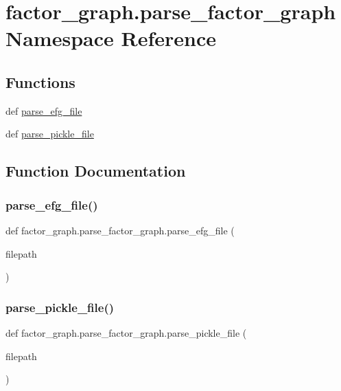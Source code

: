 \hypertarget{namespacefactor__graph_1_1parse__factor__graph}{}\section{factor\+\_\+graph.\+parse\+\_\+factor\+\_\+graph Namespace Reference}
\label{namespacefactor__graph_1_1parse__factor__graph}
\subsection*{Functions}
\begin{DoxyCompactItemize}
\item
def \hyperlink{namespacefactor__graph_1_1parse__factor__graph_afd7a03ddc8e47d16b2426b5b5edc9025}{parse\+\_\+efg\+\_\+file}
\item
def \hyperlink{namespacefactor__graph_1_1parse__factor__graph_a129eee8c2be32f4c0189a38f16fbca40}{parse\+\_\+pickle\+\_\+file}
\end{DoxyCompactItemize}


\subsection{Function Documentation}
\mbox{\label{namespacefactor__graph_1_1parse__factor__graph_afd7a03ddc8e47d16b2426b5b5edc9025}}
\subsubsection{\texorpdfstring{parse\+\_\+efg\+\_\+file()}{parse\_efg\_file()}}
{\footnotesize\ttfamily def factor\+\_\+graph.\+parse\+\_\+factor\+\_\+graph.\+parse\+\_\+efg\+\_\+file (\begin{DoxyParamCaption}\item[{}]{filepath }\end{DoxyParamCaption})}

\mbox{\label{namespacefactor__graph_1_1parse__factor__graph_a129eee8c2be32f4c0189a38f16fbca40}}
\subsubsection{\texorpdfstring{parse\+\_\+pickle\+\_\+file()}{parse\_pickle\_file()}}
{\footnotesize\ttfamily def factor\+\_\+graph.\+parse\+\_\+factor\+\_\+graph.\+parse\+\_\+pickle\+\_\+file (\begin{DoxyParamCaption}\item[{}]{filepath }\end{DoxyParamCaption})}

